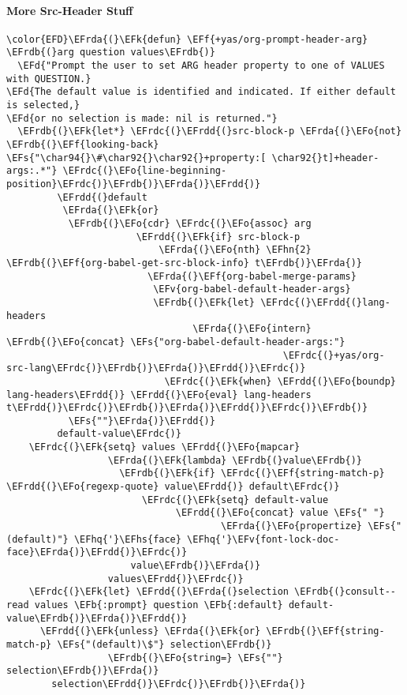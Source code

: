 \documentclass{article}
\newcommand{\EFs}[1]{\textcolor{EFs}{#1}} %
\newcommand{\EFd}[1]{\textcolor{EFd}{#1}} %
\newcommand{\EFk}[1]{\textcolor{EFk}{#1}} %
\newcommand{\EFb}[1]{\textcolor{EFb}{#1}} %
\newcommand{\EFf}[1]{\textcolor{EFf}{#1}} %
\newcommand{\EFv}[1]{\textcolor{EFv}{#1}} %
\newcommand{\EFo}[1]{\textcolor{EFo}{#1}} %
\newcommand{\EFhn}[1]{\textcolor{EFhn}{\textbf{#1}}} %
\newcommand{\EFhq}[1]{#1} %
\newcommand{\EFhs}[1]{\textcolor{EFhs}{#1}} %
\newcommand{\EFrda}[1]{\textcolor{EFrda}{#1}} %
\newcommand{\EFrdb}[1]{\textcolor{EFrdb}{#1}} %
\newcommand{\EFrdc}[1]{\textcolor{EFrdc}{#1}} %
\newcommand{\EFrdd}[1]{\textcolor{EFrdd}{#1}} %
\begin{document}
\paragraph{More Src-Header Stuff}
\label{sec:orgc0e2c91}
\begin{Code}
\begin{Verbatim}
\color{EFD}\EFrda{(}\EFk{defun} \EFf{+yas/org-prompt-header-arg} \EFrdb{(}arg question values\EFrdb{)}
  \EFd{"Prompt the user to set ARG header property to one of VALUES with QUESTION.}
\EFd{The default value is identified and indicated. If either default is selected,}
\EFd{or no selection is made: nil is returned."}
  \EFrdb{(}\EFk{let*} \EFrdc{(}\EFrdd{(}src-block-p \EFrda{(}\EFo{not} \EFrdb{(}\EFf{looking-back} \EFs{"\char94{}\#\char92{}\char92{}+property:[ \char92{}t]+header-args:.*"} \EFrdc{(}\EFo{line-beginning-position}\EFrdc{)}\EFrdb{)}\EFrda{)}\EFrdd{)}
         \EFrdd{(}default
          \EFrda{(}\EFk{or}
           \EFrdb{(}\EFo{cdr} \EFrdc{(}\EFo{assoc} arg
                       \EFrdd{(}\EFk{if} src-block-p
                           \EFrda{(}\EFo{nth} \EFhn{2} \EFrdb{(}\EFf{org-babel-get-src-block-info} t\EFrdb{)}\EFrda{)}
                         \EFrda{(}\EFf{org-babel-merge-params}
                          \EFv{org-babel-default-header-args}
                          \EFrdb{(}\EFk{let} \EFrdc{(}\EFrdd{(}lang-headers
                                 \EFrda{(}\EFo{intern} \EFrdb{(}\EFo{concat} \EFs{"org-babel-default-header-args:"}
                                                 \EFrdc{(}+yas/org-src-lang\EFrdc{)}\EFrdb{)}\EFrda{)}\EFrdd{)}\EFrdc{)}
                            \EFrdc{(}\EFk{when} \EFrdd{(}\EFo{boundp} lang-headers\EFrdd{)} \EFrdd{(}\EFo{eval} lang-headers t\EFrdd{)}\EFrdc{)}\EFrdb{)}\EFrda{)}\EFrdd{)}\EFrdc{)}\EFrdb{)}
           \EFs{""}\EFrda{)}\EFrdd{)}
         default-value\EFrdc{)}
    \EFrdc{(}\EFk{setq} values \EFrdd{(}\EFo{mapcar}
                  \EFrda{(}\EFk{lambda} \EFrdb{(}value\EFrdb{)}
                    \EFrdb{(}\EFk{if} \EFrdc{(}\EFf{string-match-p} \EFrdd{(}\EFo{regexp-quote} value\EFrdd{)} default\EFrdc{)}
                        \EFrdc{(}\EFk{setq} default-value
                              \EFrdd{(}\EFo{concat} value \EFs{" "}
                                      \EFrda{(}\EFo{propertize} \EFs{"(default)"} \EFhq{'}\EFhs{face} \EFhq{'}\EFv{font-lock-doc-face}\EFrda{)}\EFrdd{)}\EFrdc{)}
                      value\EFrdb{)}\EFrda{)}
                  values\EFrdd{)}\EFrdc{)}
    \EFrdc{(}\EFk{let} \EFrdd{(}\EFrda{(}selection \EFrdb{(}consult--read values \EFb{:prompt} question \EFb{:default} default-value\EFrdb{)}\EFrda{)}\EFrdd{)}
      \EFrdd{(}\EFk{unless} \EFrda{(}\EFk{or} \EFrdb{(}\EFf{string-match-p} \EFs{"(default)\$"} selection\EFrdb{)}
                  \EFrdb{(}\EFo{string=} \EFs{""} selection\EFrdb{)}\EFrda{)}
        selection\EFrdd{)}\EFrdc{)}\EFrdb{)}\EFrda{)}
\end{Verbatim}
\end{Code}
\end{document}
